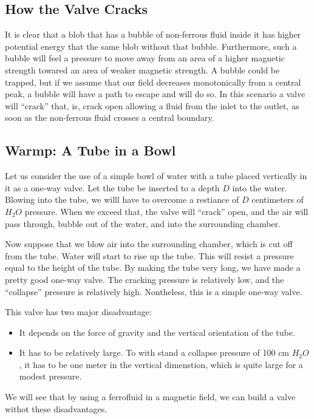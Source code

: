 \documentclass{asme2ej}
\begin{document}
\subsection{How the Valve Cracks}

It is clear that a blob that has a bubble of non-ferrous fluid inside it
has higher potential energy that the same blob without that bubble.
Furthermore, such a bubble will feel a pressure to move away from
an area of a higher magnetic strength towared an area of weaker magnetic
strength. A bubble could be trapped, but if we assume that our
field decreases monotonically from a central peak, a bubble
will have a path to escape and will do so.
In this scenario a valve will ``crack'' that, is, crack open
allowing a fluid from the inlet to the outlet, as soon as the
non-ferrous fluid crosses a central boundary.

\subsection{Warmp: A Tube in a Bowl}

Let us consider the use of a simple bowl of water with a tube placed
vertically in it as a one-way valve.
Let the tube be inserted to a depth $D$ into the water.
Blowing into the tube, we willl have to overcome a restiance of $D$
centimeters of $H_2O$ pressure. When we exceed that, the valve will
``crack'' open, and the air will pass through, bubble out of the water,
and into the surrounding chamber.

Now suppose that we blow air into the surrounding chamber, which is
cut off from the tube. Water will start to rise up the tube.
This will resist a pressure equal to the height of the tube.
By making the tube very long, we have made a pretty good one-way valve.
The cracking pressure is relatively low, and the ``collapse'' pressure
is relatively high.  Nontheless, this is a simple one-way valve.

This valve has two major disadvantage:
\begin{itemize}
\item It depends on the force of gravity and the vertical orientation
  of the tube.
\item It has to be relatively large. To with stand a collapse pressure
  of 100 cm $H_2O$, it has to be one meter in the vertical dimenstion,
  which is quite large for a modest pressure.
\end{itemize}

We will see that by using a ferrofluid in a magnetic field, we can
build a valve withot these disadvantages.
\end{document}

